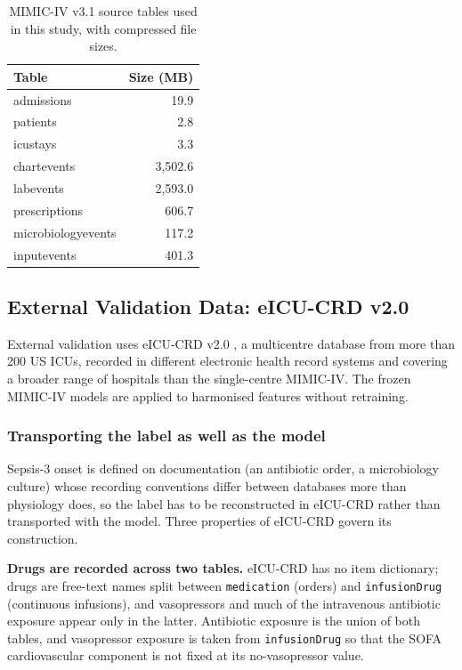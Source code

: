 \begin{table}[H]
    \centering
    \begin{tabular}{lr}
        \toprule
        \textbf{Table}     & \textbf{Size (MB)} \\
        \midrule
        admissions         & 19.9               \\
        patients           & 2.8                \\
        icustays           & 3.3                \\
        chartevents        & 3,502.6            \\
        labevents          & 2,593.0            \\
        prescriptions      & 606.7              \\
        microbiologyevents & 117.2              \\
        inputevents        & 401.3              \\
        \bottomrule
    \end{tabular}
    \caption{MIMIC-IV v3.1 source tables used in this study, with compressed
    file sizes.}
    \label{tab:data_sources}
\end{table}

\subsection{External Validation Data: eICU-CRD v2.0}

External validation uses eICU-CRD v2.0 \cite{pollard2018eicu}, a multicentre
database from more than 200 US ICUs, recorded in different electronic health
record systems and covering a broader range of hospitals than the single-centre
MIMIC-IV. The frozen MIMIC-IV models are applied to harmonised features
without retraining.

\subsubsection{Transporting the label as well as the model}
\label{sec:label_transport}

Sepsis-3 onset is defined on documentation (an antibiotic order, a
microbiology culture) whose recording conventions differ between databases
more than physiology does, so the label has to be reconstructed in eICU-CRD
rather than transported with the model. Three properties of eICU-CRD govern
its construction.

\textbf{Drugs are recorded across two tables.} eICU-CRD has no item
dictionary; drugs are free-text names split between \texttt{medication}
(orders) and \texttt{infusionDrug} (continuous infusions), and vasopressors and
much of the intravenous antibiotic exposure appear only in the latter.
Antibiotic exposure is the union of both tables, and vasopressor exposure is
taken from \texttt{infusionDrug} so that the SOFA cardiovascular component is
not fixed at its no-vasopressor value.


